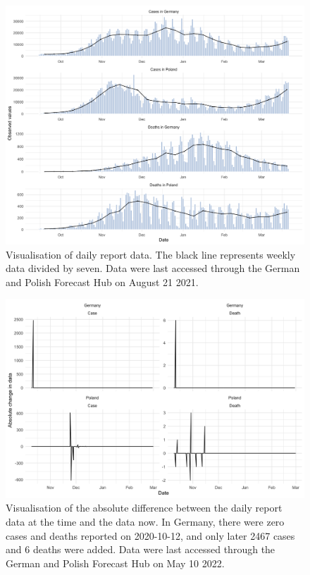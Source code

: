 \documentclass[10pt,letterpaper]{article}
\begin{document}
\begin{figure}[H]
\includegraphics[width=1\linewidth,]{../analysis/plots/daily_truth} \caption{Visualisation of daily report data. The black line represents weekly data divided by seven. Data were last accessed through the German and Polish Forecast Hub on August 21 2021.}\label{fig:daily-truth}
\end{figure}

\begin{figure}[H]
\includegraphics[width=1\linewidth,]{../analysis/plots/daily-data-updates} \caption{Visualisation of the absolute difference between the daily report data at the time and the data now. In Germany, there were zero cases and deaths reported on 2020-10-12, and only later 2467 cases and 6 deaths were added. Data were last accessed through the German and Polish Forecast Hub on May 10 2022.}\label{fig:daily-truth-update}
\end{figure}
\end{document}
